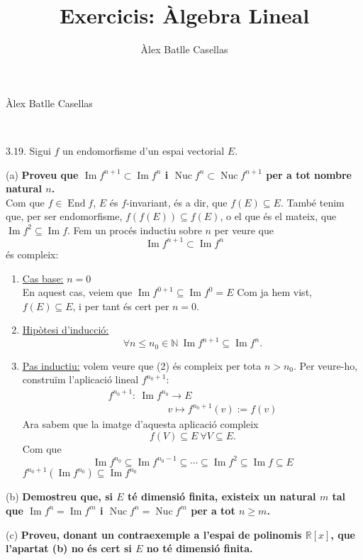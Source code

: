 \documentclass[11pt]{article}
\title{Exercicis: Àlgebra Lineal}
\author{Àlex Batlle Casellas}
\DeclareMathOperator{\nuc}{Nuc}
\DeclareMathOperator{\img}{Im}
\DeclareMathOperator{\End}{End}
\begin{document}
\begin{small}
Àlex Batlle Casellas
\end{small}\\

\begin{legal}
\item[3.19.] Sigui $f$ un endomorfisme d'un espai vectorial $E$.
	\item[(a) ]\textbf{Proveu que $\img{f^{n+1}}\subset\img{f^n}$ i $\nuc{f^n}\subset\nuc{f^{n+1}}$ per a tot nombre natural $n$.}\\
	Com que $f\in\End{f}$, $E$ és $f$-invariant, és a dir, que $f(E)\subseteq E$. També tenim que, per ser endomorfisme, $f(f(E))\subseteq f(E)$, o el que és el mateix, que $\img{f^2}\subseteq\img{f}$. Fem un procés inductiu sobre $n$ per veure que 
	\begin{equation}
		\img{f^{n+1}}\subset\img{f^n}
	\end{equation}
	és compleix:
	\begin{enumerate}
		\item \underline{Cas base:} $n=0$\\
		En aquest cas, veiem que $\img{f^{0+1}\subseteq\img{f^0}}=E$ Com ja hem vist, $f(E)\subseteq E$, i per tant és cert per $n=0$.
		\item \underline{Hipòtesi d'inducció:}
		\begin{equation}
			\forall n\leq n_0\in\mathbb{N}\ \img{f^{n+1}}\subseteq\img{f^n}.
		\end{equation}
		\item \underline{Pas inductiu:} volem veure que (2) és compleix per tota $n>n_0$. Per veure-ho, construïm l'aplicació lineal $f^{n_0+1}$:
		$$
		\begin{array}{lrr}
			f^{n_0+1}:\ \img{f^{n_0}}\longrightarrow E\\
			\qquad\qquad\qquad v\longmapsto f^{n_0+1}(v):=f(v)
		\end{array}
		$$
		Ara sabem que la imatge d'aquesta aplicació compleix
		\begin{equation}
			f(V)\subseteq E\ \forall V\subseteq E.
		\end{equation}
		Com que
		$$\img{f^{n_0}}\subseteq\img{f^{n_0-1}}\subseteq\cdots\subseteq\img{f^{2}}\subseteq\img{f}\subseteq E$$
		$f^{n_0+1}(\img{f^{n_0}})\subseteq\img{f^{n_0}}$
	\end{enumerate}
	\item[(b) ]\textbf{Demostreu que, si $E$ té dimensió finita, existeix un natural $m$ tal que $\img{f^n}=\img{f^m}$ i $\nuc{f^n}=\nuc{f^m}$ per a tot $n\geq m$.}\\
	\item[(c) ]\textbf{Proveu, donant un contraexemple a l’espai de polinomis $\mathbb{R}[x]$, que l’apartat (b) no és cert si $E$ no té dimensió finita.}\\
\end{legal}
\end{document}
